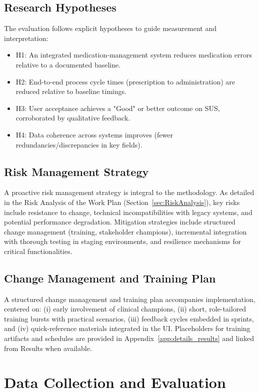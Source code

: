 \subsection{Research Hypotheses}
The evaluation follows explicit hypotheses to guide measurement and interpretation:
\begin{itemize}
    \item H1: An integrated medication-management system reduces medication errors relative to a documented baseline.
    \item H2: End-to-end process cycle times (prescription to administration) are reduced relative to baseline timings.
    \item H3: User acceptance achieves a "Good" or better outcome on SUS, corroborated by qualitative feedback.
    \item H4: Data coherence across systems improves (fewer redundancies/discrepancies in key fields).
\end{itemize}

\subsection{Risk Management Strategy}

A proactive risk management strategy is integral to the methodology. As detailed in the Risk Analysis of the Work Plan (Section~\ref{sec:RiskAnalysis}), key risks include resistance to change, technical incompatibilities with legacy systems, and potential performance degradation. Mitigation strategies include structured change management (training, stakeholder champions), incremental integration with thorough testing in staging environments, and resilience mechanisms for critical functionalities.

\subsection{Change Management and Training Plan}
A structured change management and training plan accompanies implementation, centered on: (i) early involvement of clinical champions, (ii) short, role-tailored training bursts with practical scenarios, (iii) feedback cycles embedded in sprints, and (iv) quick-reference materials integrated in the UI. Placeholders for training artifacts and schedules are provided in Appendix~\ref{app:details_results} and linked from Results when available.

\section{Data Collection and Evaluation}

